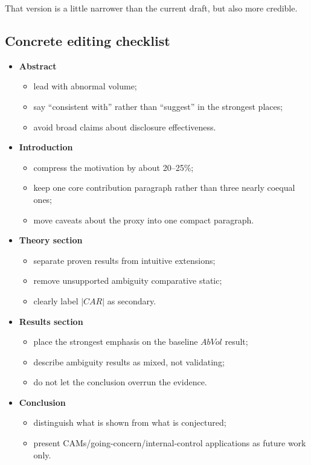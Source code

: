 \documentclass[11pt]{article}
\begin{document}
That version is a little narrower than the current draft, but also more credible.

\subsection*{Concrete editing checklist}
\begin{itemize}
    \item \textbf{Abstract}
    \begin{itemize}
        \item lead with abnormal volume;
        \item say ``consistent with'' rather than ``suggest'' in the strongest places;
        \item avoid broad claims about disclosure effectiveness.
    \end{itemize}
    \item \textbf{Introduction}
    \begin{itemize}
        \item compress the motivation by about 20--25\%;
        \item keep one core contribution paragraph rather than three nearly coequal ones;
        \item move caveats about the proxy into one compact paragraph.
    \end{itemize}
    \item \textbf{Theory section}
    \begin{itemize}
        \item separate proven results from intuitive extensions;
        \item remove unsupported ambiguity comparative static;
        \item clearly label $|CAR|$ as secondary.
    \end{itemize}
    \item \textbf{Results section}
    \begin{itemize}
        \item place the strongest emphasis on the baseline $AbVol$ result;
        \item describe ambiguity results as mixed, not validating;
        \item do not let the conclusion overrun the evidence.
    \end{itemize}
    \item \textbf{Conclusion}
    \begin{itemize}
        \item distinguish what is shown from what is conjectured;
        \item present CAMs/going-concern/internal-control applications as future work only.
    \end{itemize}
\end{itemize}
\end{document}
